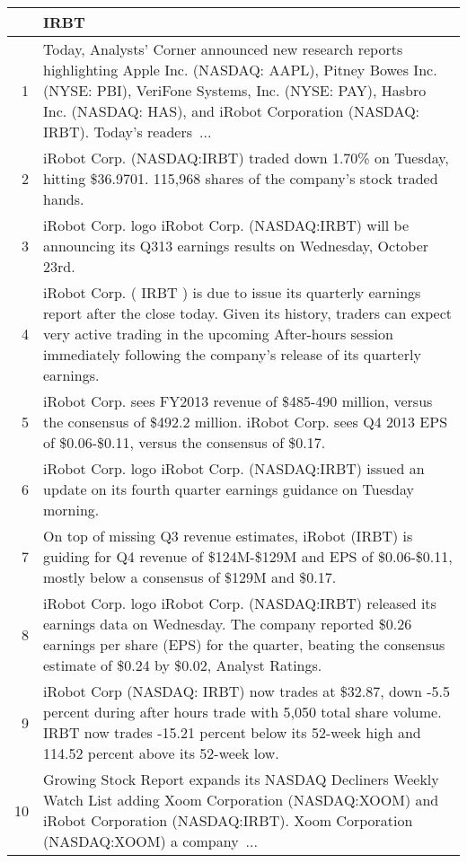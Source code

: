 \documentclass{tufte-handout}\usepackage[]{graphicx}\usepackage[]{color}
\begin{document}
\begin{tabularx}{\textwidth}{rX}
  \hline
 & IRBT \\ 
  \hline
1 &  Today, Analysts' Corner announced new research reports highlighting Apple Inc. (NASDAQ: AAPL), Pitney Bowes Inc. (NYSE: PBI), VeriFone Systems, Inc. (NYSE: PAY), Hasbro Inc. (NASDAQ: HAS), and iRobot Corporation (NASDAQ: IRBT). Today's readers ...  \\ 
  2 &  iRobot Corp. (NASDAQ:IRBT) traded down 1.70\% on Tuesday, hitting \$36.9701. 115,968 shares of the company's stock traded hands.  \\ 
  3 &  iRobot Corp. logo iRobot Corp. (NASDAQ:IRBT) will be announcing its Q313 earnings results on Wednesday, October 23rd.  \\ 
  4 &  iRobot Corp. ( IRBT ) is due to issue its quarterly earnings report after the close today. Given its history, traders can expect very active trading in the upcoming After-hours session immediately following the company's release of its quarterly earnings.  \\ 
  5 &  iRobot Corp. sees FY2013 revenue of \$485-490 million, versus the consensus of \$492.2 million. iRobot Corp. sees Q4 2013 EPS of \$0.06-\$0.11, versus the consensus of \$0.17.  \\ 
  6 &  iRobot Corp. logo iRobot Corp. (NASDAQ:IRBT) issued an update on its fourth quarter earnings guidance on Tuesday morning.  \\ 
  7 &  On top of missing Q3 revenue estimates, iRobot (IRBT) is guiding for Q4 revenue of \$124M-\$129M and EPS of \$0.06-\$0.11, mostly below a consensus of \$129M and \$0.17.  \\ 
  8 &  iRobot Corp. logo iRobot Corp. (NASDAQ:IRBT) released its earnings data on Wednesday. The company reported \$0.26 earnings per share (EPS) for the quarter, beating the consensus estimate of \$0.24 by \$0.02, Analyst Ratings.  \\ 
  9 &  iRobot Corp (NASDAQ: IRBT) now trades at \$32.87, down -5.5 percent during after hours trade with 5,050 total share volume. IRBT now trades -15.21 percent below its 52-week high and 114.52 percent above its 52-week low.  \\ 
  10 &  Growing Stock Report expands its NASDAQ Decliners Weekly Watch List adding Xoom Corporation (NASDAQ:XOOM) and iRobot Corporation (NASDAQ:IRBT). Xoom Corporation (NASDAQ:XOOM) a company ...  \\ 
   \hline
\end{tabularx}
\end{document}
